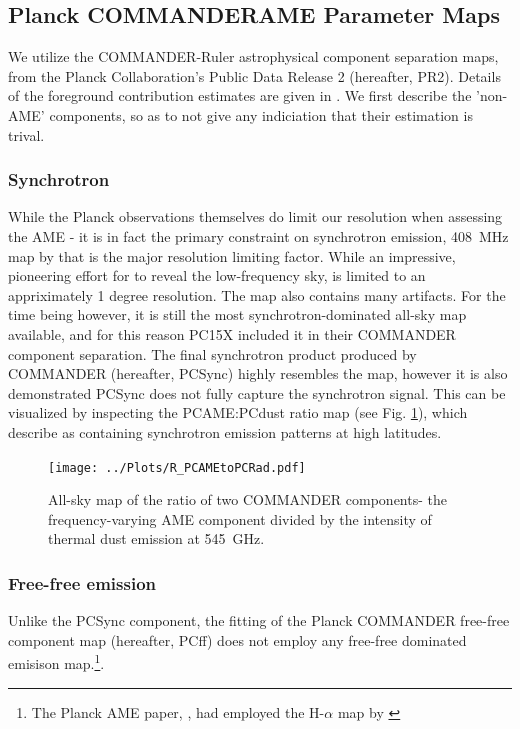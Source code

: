   \subsection{Planck COMMANDERAME Parameter Maps}

       We utilize the COMMANDER-Ruler astrophysical component separation maps, from the Planck Collaboration's Public Data Release 2 (hereafter, PR2). Details of the foreground contribution estimates are given in \cite{planckXII}. We first describe the 'non-AME' components, so as to not give any indiciation that their estimation is trival.

       \subsubsection{Synchrotron}
        While the Planck observations themselves do limit our resolution when assessing the AME - it is in fact the primary constraint on synchrotron emission, 408~MHz map by \cite{haslam82} that is the major resolution limiting factor. While an impressive, pioneering effort for to reveal the low-frequency sky, \citep{haslam82} is limited to an appriximately 1 degree resolution. The map also contains
        many artifacts. For the time being however, it is still the most synchrotron-dominated all-sky map available, and for this reason PC15X included it in their COMMANDER component separation. The final synchrotron product produced by COMMANDER (hereafter, PCSync) highly resembles the \citep{haslam82} map, however it is also demonstrated PCSync does not fully capture the synchrotron signal. This can be visualized by inspecting the PCAME:PCdust ratio map (see Fig. \ref{fig:R_PCAMEtoPCdust}), which \cite{hensley17} describe as containing synchrotron emission patterns at high latitudes.

        \begin{figure}
        \label{fig:R_PCAMEtoPCdust}
        \centering
        \texttt{[image: ../Plots/R\_PCAMEtoPCRad.pdf]}
        \caption{All-sky map of the ratio of two COMMANDER components- the frequency-varying AME component divided by the intensity of thermal dust emission at 545~GHz. }
        \end{figure}

       \subsubsection{Free-free emission}
        Unlike the PCSync component, the fitting of the Planck COMMANDER free-free component map (hereafter, PCff) does not employ any free-free dominated emisison map.\footnote{The Planck AME paper, \cite{planckXV}, had employed the H-$\alpha$ map by \cite{wham98}}.

